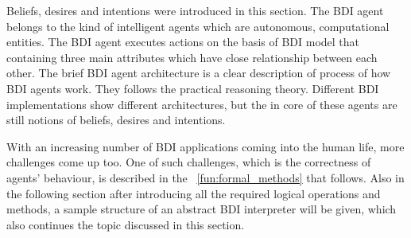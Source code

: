  Beliefs, desires and intentions were introduced in this section. The BDI agent belongs to the kind of intelligent agents which are autonomous, computational entities. The BDI agent executes actions on the basis of BDI model that containing three main attributes which have close relationship between each other. The brief BDI agent architecture is a clear description of process of how BDI agents work. They follows the practical reasoning theory. Different BDI implementations show different architectures, but the in core of these agents are still notions of beliefs, desires and intentions.

 With an increasing number of BDI applications coming into the human life, more challenges come up too. One of such challenges, which is the correctness of agents' behaviour, is described in the ~\autoref{fun:formal_methods} that follows. Also in the following section after introducing all the required logical operations and methods, a sample structure of an abstract BDI interpreter will be given, which also continues the topic discussed in this section.



